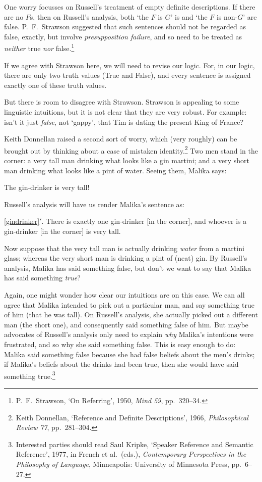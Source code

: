 One worry focusses on Russell's treatment of empty definite descriptions. If there are no $F$s, then on Russell's analysis, both `the $F$ is $G$' is and  `the $F$ is non-$G$' are false. P.~F.\ Strawson suggested that such sentences should not be regarded as false, exactly, but involve \emph{presupposition failure}, and so need to be treated as \emph{neither} true \emph{nor} false.\footnote{P.~F.\ Strawson, `On Referring', 1950, \emph{Mind 59}, pp.\ 320--34.}

If we agree with Strawson here, we will need to revise our logic. For, in our logic, there are only two truth values (True and False), and every sentence is assigned exactly one of these truth values.

But there is room to disagree with Strawson. Strawson is appealing to some linguistic intuitions, but it is not clear that they are very robust. For example: isn't it just \emph{false}, not `gappy', that Tim is dating the present King of France?

Keith Donnellan raised a second sort of worry, which (very roughly) can be brought out by thinking about a case of mistaken identity.\footnote{Keith Donnellan, `Reference and Definite Descriptions', 1966, \emph{Philosophical Review 77}, pp.\ 281--304.} Two men stand in the corner: a very tall man drinking what looks like a gin martini; and a very short man drinking what looks like a pint of water. Seeing them, Malika says:
	\begin{earg}
		\item[\ex{gindrinker}] The gin-drinker is very tall!
	\end{earg}
Russell's analysis will have us render Malika's sentence as:
	\begin{earg}
		\item[\ref{gindrinker}$'$.] There is exactly one gin-drinker [in the corner], and whoever is a gin-drinker [in the corner] is very tall.
	\end{earg}
Now suppose that the very tall man is actually drinking \emph{water} from a martini glass; whereas the very short man is drinking a pint of (neat) gin. By Russell's analysis, Malika has said something false, but don't we want to say that Malika has said something \emph{true}? 

Again, one might wonder how clear our intuitions are on this case. We can all agree that Malika intended to pick out a particular man, and say something true of him (that he was tall). On Russell's analysis, she actually picked out a different man (the short one), and consequently said something false of him. But  maybe advocates of Russell's analysis only need to explain \emph{why} Malika's intentions were frustrated, and so why she said something false. This is easy enough to do:  Malika said something false because she had false beliefs about the men's drinks; if Malika's beliefs about the drinks had been true,  then she would have said something true.\footnote{Interested parties should read Saul Kripke, `Speaker Reference and Semantic Reference', 1977, in French et al.\ (eds.), \emph{Contemporary Perspectives in the Philosophy of Language}, Minneapolis: University of Minnesota Press, pp.\ 6--27.}

